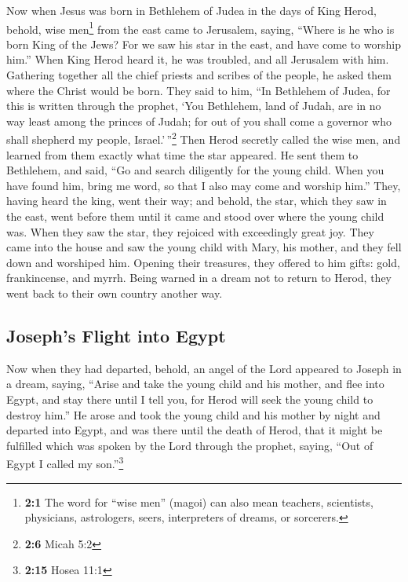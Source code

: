  Now when Jesus was born in Bethlehem of Judea in the days
of King Herod, behold, wise men\footnote{\textbf{2:1} The word for
  ``wise men'' (magoi) can also mean teachers, scientists, physicians,
  astrologers, seers, interpreters of dreams, or sorcerers.} from the
east came to Jerusalem, saying,  ``Where is he who is born
King of the Jews? For we saw his star in the east, and have come to
worship him.''  When King Herod heard it, he was troubled,
and all Jerusalem with him.  Gathering together all the
chief priests and scribes of the people, he asked them where the Christ
would be born.  They said to him, ``In Bethlehem of Judea,
for this is written through the prophet,  `You Bethlehem,
land of Judah, are in no way least among the princes of Judah; for out
of you shall come a governor who shall shepherd my people,
Israel.'\,''\footnote{\textbf{2:6} Micah 5:2}  Then Herod
secretly called the wise men, and learned from them exactly what time
the star appeared.  He sent them to Bethlehem, and said,
``Go and search diligently for the young child. When you have found him,
bring me word, so that I also may come and worship him.'' 
They, having heard the king, went their way; and behold, the star, which
they saw in the east, went before them until it came and stood over
where the young child was.  When they saw the star, they
rejoiced with exceedingly great joy.  They came into the
house and saw the young child with Mary, his mother, and they fell down
and worshiped him. Opening their treasures, they offered to him gifts:
gold, frankincense, and myrrh.  Being warned in a dream
not to return to Herod, they went back to their own country another way.

\hypertarget{josephs-flight-into-egypt}{%
\subsection{Joseph's Flight into
Egypt}\label{josephs-flight-into-egypt}}

 Now when they had departed, behold, an angel of the Lord
appeared to Joseph in a dream, saying, ``Arise and take the young child
and his mother, and flee into Egypt, and stay there until I tell you,
for Herod will seek the young child to destroy him.''  He
arose and took the young child and his mother by night and departed into
Egypt,  and was there until the death of Herod, that it
might be fulfilled which was spoken by the Lord through the prophet,
saying, ``Out of Egypt I called my son.''\footnote{\textbf{2:15} Hosea
  11:1}

